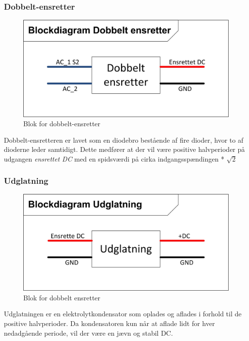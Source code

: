 \subsubsection{Dobbelt-ensretter}
\begin{figure}[H]
\centering
\includegraphics[scale=1]{billeder/DobbeltensretterBlok}
\caption{Blok for dobbelt-ensretter}
\label{fig:DobbeltensretterBlok1}
\end{figure}
Dobbelt-ensretteren er lavet som en diodebro bestående af fire dioder, hvor to af dioderne leder samtidigt. Dette medfører at der vil være positive halvperioder på udgangen \textit{ensrettet DC} med en spidsværdi på cirka indgangsspændingen * $\sqrt{2}$

\subsubsection{Udglatning}
\begin{figure}[H]
\centering
\includegraphics[scale=1]{billeder/UdglatningsBlok}
\caption{Blok for dobbelt ensretter}
\label{fig:DobbeltensretterBlok2}
\end{figure}
Udglatningen er en elektrolytkondensator som oplades og aflades i forhold til de positive halvperioder. Da kondensatoren kun når at aflade lidt for hver nedadgående periode, vil der være en jævn og stabil DC.  

